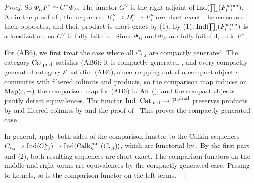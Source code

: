 \begin{proof}
		So $\Phi_DF^{\vee} \simeq G^{\vee}\Phi_E$. The functor $G^{\vee}$ is the right adjoint of $\operatorname{Ind}(\prod_i (F_i^{\kappa})^{\textup{op}})$. As in the proof of , the sequences $K_i^{\kappa} \to D_i^{\kappa} \to E_i^{\kappa}$ are short exact \cite[Proposition~A.26]{Ramzi_Dualizable_Presentable}, hence so are their opposites, and their product is short exact by (1). By (1), $\operatorname{Ind}(\prod_i (F_i^{\kappa})^{\textup{op}})$ is a localization, so $G^{\vee}$ is fully faithful. Since $\Phi_D$ and $\Phi_E$ are fully faithful, so is $F^{\vee}$.

		For (AB6), we first treat the case where all $C_{i,j}$ are compactly generated. The category ${\textup{Cat}}_{\operatorname{perf}}$ satisfies (AB6): it is compactly generated \cite[Proposition~1.4(3)]{Efimov_Large_Categories}, and every compactly generated category $\mathcal{E}$ satisfies (AB6), since mapping out of a compact object $c$ commutes with filtered colimits and products, so the comparison map induces on $\operatorname{Map}(c,-)$ the comparison map for (AB6) in ${\textup{An}}$ (), and the compact objects jointly detect equivalences. The functor $\operatorname{Ind}\colon {\textup{Cat}}_{\operatorname{perf}} \to \textup{Pr}^{\operatorname{dual}}$ preserves products by  and filtered colimits by  and the proof of . This proves the compactly generated case.

		In general, apply both sides of the comparison functor to the Calkin sequences $C_{i,j} \to \operatorname{Ind}(C_{i,j}^{\kappa}) \to \operatorname{Ind}(\operatorname{Calk}^{\operatorname{cont}}_{\kappa}(C_{i,j}))$, which are functorial by . By the first part and (2), both resulting sequences are short exact. The comparison functors on the middle and right terms are equivalences by the compactly generated case. Passing to kernels, so is the comparison functor on the left terms.
	\end{proof}
